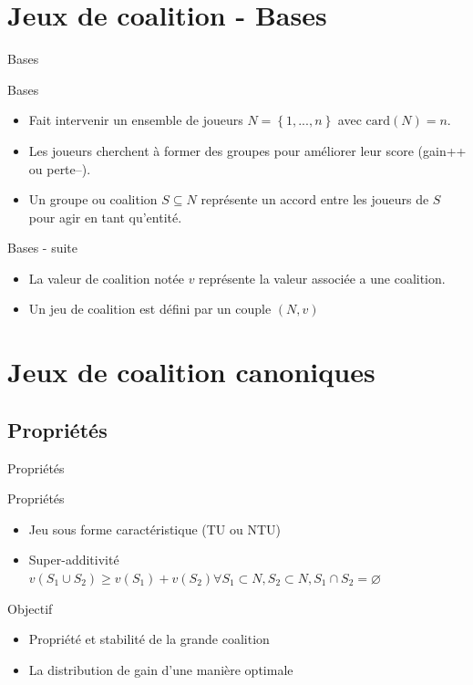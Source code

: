 \documentclass{isimabeamer}
\begin{document}
\section{Jeux de coalition - Bases}

\begin{frame}{Bases}
\begin{block}{Bases}
\begin{itemize}
    \item Fait intervenir un ensemble de joueurs $N = \left \{1,...,n \right \}$ avec $\text{card}(N) = n$.
    \item Les joueurs cherchent à former des groupes pour améliorer leur score (gain++ ou perte--).
    \item Un groupe ou coalition $S \subseteq N $ représente un accord entre les joueurs de $S$ pour agir en tant qu'entité. 
\end{itemize}
\end{block}

\begin{block}{Bases - suite}
\begin{itemize}
    \item La valeur de coalition notée $v$ représente la valeur associée a une coalition.  
    \item Un jeu de coalition est défini par un couple $(N,v)$
\end{itemize}
\end{block}
\end{frame}




\section{Jeux de coalition canoniques}

\subsection{Propriétés}

\begin{frame}{Propriétés}
\begin{block}{Propriétés}
\begin{itemize}
    \item Jeu sous forme caractéristique (TU ou NTU)
    \item Super-additivité $v(S_1 \cup S_2) \ge v(S_1) + v(S_2)  \forall S_1 \subset  N, S_2 \subset N, S_1 \cap S_2 = \varnothing   $
\end{itemize}
\end{block}
\begin{block}{Objectif}
\begin{itemize}
\item Propriété et stabilité de la grande coalition
\item La distribution de gain d'une manière optimale
\end{itemize}
\end{block}

\end{frame}
\end{document}
